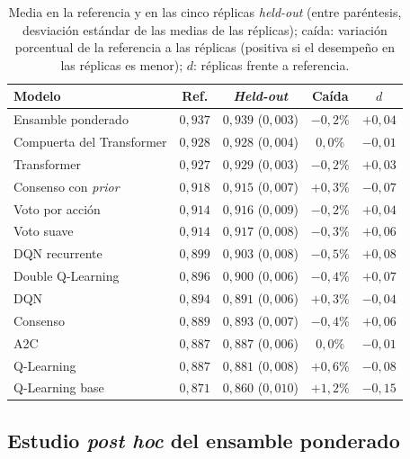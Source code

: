 \documentclass[../00_Main/Main.tex]{subfiles}
\begin{document}
\begin{table}[H]
\centering
\caption[Referencia frente a las r\'eplicas \emph{held-out}]{Media en la
referencia y en las cinco r\'eplicas \emph{held-out} (entre par\'entesis,
desviaci\'on est\'andar de las medias de las r\'eplicas); ca\'ida:
variaci\'on porcentual de la referencia a las r\'eplicas (positiva si el desempe\~no en las r\'eplicas es menor); $d$: r\'eplicas frente a referencia.}
\label{tab:heldout}
\small
\begin{tabular}{@{}lcccc@{}}
\toprule
\textbf{Modelo} & \textbf{Ref.} & \textbf{\emph{Held-out}} & \textbf{Ca\'ida} & $d$ \\
\midrule
Ensamble ponderado          & $0{,}937$ & $0{,}939$ ($0{,}003$) & $-0{,}2\%$ & $+0{,}04$ \\
Compuerta del Transformer   & $0{,}928$ & $0{,}928$ ($0{,}004$) & $0{,}0\%$ & $-0{,}01$ \\
Transformer                 & $0{,}927$ & $0{,}929$ ($0{,}003$) & $-0{,}2\%$ & $+0{,}03$ \\
Consenso con \emph{prior}          & $0{,}918$ & $0{,}915$ ($0{,}007$) & $+0{,}3\%$ & $-0{,}07$ \\
Voto por acci\'on           & $0{,}914$ & $0{,}916$ ($0{,}009$) & $-0{,}2\%$ & $+0{,}04$ \\
Voto suave                  & $0{,}914$ & $0{,}917$ ($0{,}008$) & $-0{,}3\%$ & $+0{,}06$ \\
DQN recurrente              & $0{,}899$ & $0{,}903$ ($0{,}008$) & $-0{,}5\%$ & $+0{,}08$ \\
Double Q-Learning           & $0{,}896$ & $0{,}900$ ($0{,}006$) & $-0{,}4\%$ & $+0{,}07$ \\
DQN                         & $0{,}894$ & $0{,}891$ ($0{,}006$) & $+0{,}3\%$ & $-0{,}04$ \\
Consenso                    & $0{,}889$ & $0{,}893$ ($0{,}007$) & $-0{,}4\%$ & $+0{,}06$ \\
A2C                         & $0{,}887$ & $0{,}887$ ($0{,}006$) & $0{,}0\%$ & $-0{,}01$ \\
Q-Learning                  & $0{,}887$ & $0{,}881$ ($0{,}008$) & $+0{,}6\%$ & $-0{,}08$ \\
Q-Learning base             & $0{,}871$ & $0{,}860$ ($0{,}010$) & $+1{,}2\%$ & $-0{,}15$ \\
\bottomrule
\end{tabular}
\end{table}

\subsection{Estudio \emph{post hoc} del ensamble ponderado}\label{sec:res-posthoc}
\end{document}
